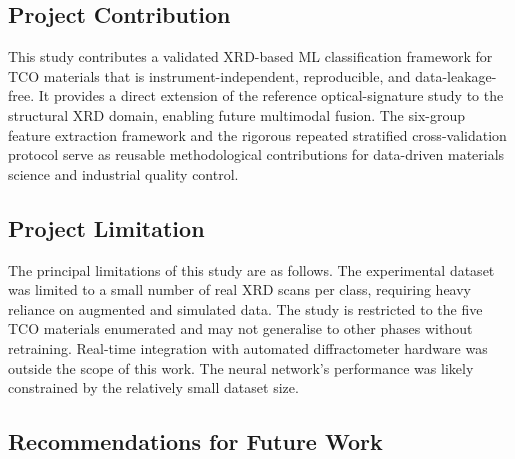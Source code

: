 \documentclass[12pt, oneside]{article} %
\begin{document}
\subsection{Project Contribution}

This study contributes a validated XRD-based ML classification framework for TCO materials that is instrument-independent, reproducible, and data-leakage-free. It provides a direct extension of the reference optical-signature study to the structural XRD domain, enabling future multimodal fusion. The six-group feature extraction framework and the rigorous repeated stratified cross-validation protocol serve as reusable methodological contributions for data-driven materials science and industrial quality control.


\subsection{Project Limitation}

The principal limitations of this study are as follows. The experimental dataset was limited to a small number of real XRD scans per class, requiring heavy reliance on augmented and simulated data. The study is restricted to the five TCO materials enumerated and may not generalise to other phases without retraining. Real-time integration with automated diffractometer hardware was outside the scope of this work. The neural network's performance was likely constrained by the relatively small dataset size.


\subsection{Recommendations for Future Work}
\end{document}
